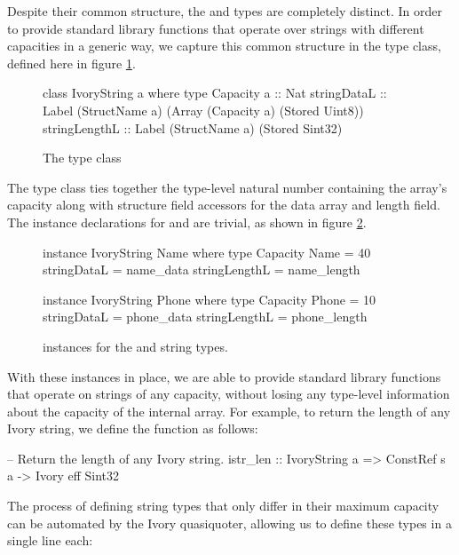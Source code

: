 Despite their common structure, the  and  types
are completely distinct. In order to provide standard library
functions that operate over strings with different capacities in a generic
way, we capture this common structure in the  type
class, defined here in figure \ref{ivory-string-class}.

\begin{figure}[h]
\begin{code}
class IvoryString a where
  type Capacity a :: Nat
  stringDataL   :: Label (StructName a)
                         (Array (Capacity a)
                                (Stored Uint8))
  stringLengthL :: Label (StructName a)
                         (Stored Sint32)
\end{code}
\caption{The  type class}
\label{ivory-string-class}
\end{figure}

The  type class ties together the type-level natural
number containing the array's capacity %
along with structure field accessors
for the data array and length field. The instance declarations for 
and  are trivial, as shown in figure \ref{ivory-string-instances}.

\begin{figure}[h]
\begin{code}
instance IvoryString Name where
  type Capacity Name = 40
  stringDataL = name_data
  stringLengthL = name_length

instance IvoryString Phone where
  type Capacity Phone = 10
  stringDataL = phone_data
  stringLengthL = phone_length
\end{code}
\caption{ instances for the  and 
string types.}
\label{ivory-string-instances}
\end{figure}

With these instances in place, we are able to provide standard library
functions that operate on strings of any capacity, without losing any
type-level information about the capacity of the internal array. For
example, to return the length of any Ivory string, we define the
 function as follows:

\begin{code}
-- Return the length of any Ivory string.
istr_len :: IvoryString a
         => ConstRef s a -> Ivory eff Sint32
\end{code}

The process of defining string types that only differ
in their maximum capacity can be automated by the Ivory quasiquoter,
allowing us to define these types in a single line each:

